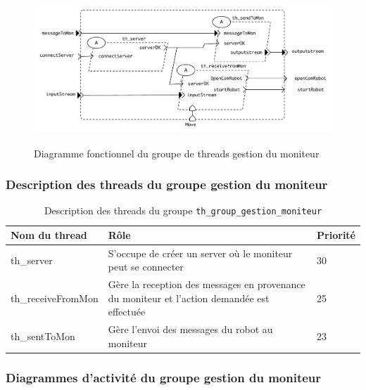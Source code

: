 \documentclass[11pt, a4paper]{paper}
\begin{document}
\begin{figure}[htbp]
\label{fig:diag_fonc_moniteur}
\begin{center}
{\includegraphics[scale=.5]{./figures-pdf/diag_fonc_moniteur}}
{\caption{Diagramme fonctionnel du groupe de threads gestion du moniteur}}
\end{center}
\end{figure}
\FloatBarrier

\subsubsection{Description des threads  du groupe gestion du moniteur}

\begin{table}[htp]
\caption{Description des threads du groupe {\tt th\_group\_gestion\_moniteur}}
\begin{center}
\begin{tabular}{|p{4cm}|p{7.5cm}|p{2cm}|}
\hline
\bf Nom du thread &	\bf Rôle &	\bf Priorité \\
\hline
\hline
\color{blue}th\_server	& \color{blue}S'occupe de créer un server où le moniteur peut se connecter & \color{blue}30\\
\hline
\color{blue}th\_receiveFromMon &	\color{blue}Gère la reception des messages en provenance du moniteur et l'action demandée est effectuée &	\color{blue}25\\
\hline
\color{blue}th\_sentToMon	& \color{blue}Gère l'envoi des messages du robot au moniteur & \color{blue}23\\
\hline
\end{tabular}
\end{center}
\label{tab:gt_moniteur}
\end{table}%

\subsubsection{Diagrammes d'activité  du groupe gestion du moniteur}
\end{document}

